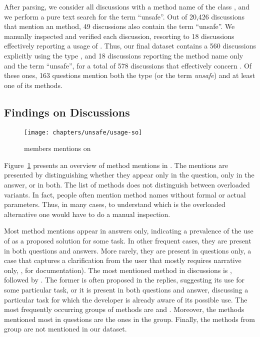 After parsing, we consider all discussions with a method name of the class \unsafe{},
and we perform a pure text search for the term ``unsafe''.
Out of 20,426 discussions that mention an \unsafe{} method,
49 discussions also contain the term ``unsafe''.
We manually inspected and verified each discussion,
resorting to 18 discussions effectively reporting a usage of \smu{}.
Thus, our final dataset contains a 560 discussions explicitly using the type \unsafe{},
and 18 discussions reporting the method name only and the term ``unsafe'',
for a total of 578 discussions that effectively concern \smu{}.
Of these ones, 163 questions mention both the type (or the term \emph{unsafe}) and at least one of its methods.


\subsection{Findings on \stackoverflow{} Discussions}

\begin{figure}[p]
\centering
\texttt{[image: chapters/unsafe/usage-so]}
\caption{\smu{} members mentions on \stackoverflow{}}
\label{fig:unsafe:usage-so}
\end{figure}

Figure~\ref{fig:unsafe:usage-so} presents an overview of \smu{} method mentions in \stackoverflow{}.
The mentions are presented by distinguishing whether they appear only in the question,
only in the answer, or in both.
The list of methods does not distinguish between overloaded variants.
In fact, people often mention method names without formal or actual parameters.
Thus, in many cases, to understand which is the overloaded alternative one would have to do a manual inspection. 

Most method mentions appear in answers only,
indicating a prevalence of the use of \smu{} as a proposed solution for some task.
In other frequent cases, they are present in both questions and answers.
More rarely, they are present in questions only,
a case that captures a clarification from the user that mostly requires narrative only,
\eg{}, for documentation).
The most mentioned method in \stackoverflow{} discussions is ,
followed by .
The former is often proposed in the replies,
suggesting its use for some particular task,
or it is present in both questions and answer,
discussing a particular task for which the developer is already aware of its possible use.
The most frequently occurring groups of methods are  and .
Moreover, the methods mentioned most in questions are the ones in the  group.
Finally, the methods from  group are not mentioned in our dataset.

